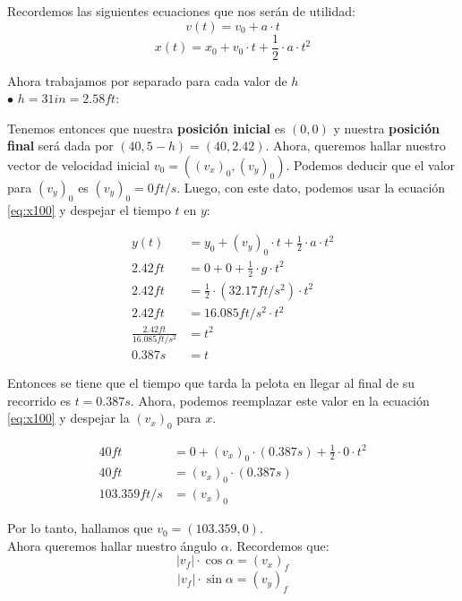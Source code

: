 \documentclass[11pt]{article}
\begin{document}
Recordemos las siguientes ecuaciones que nos serán de utilidad:
\begin{equation}
  \label{eq:v100}
  v(t) = v_0 + a \cdot t
\end{equation}
\begin{equation}
  \label{eq:x100}
  x(t) = x_0 + v_0 \cdot t + \frac{1}{2} \cdot a \cdot t^2 
\end{equation}

Ahora trabajamos por separado para cada valor de $h$ \\
 
$\bullet$ $h = 31in = 2.58ft$:

Tenemos entonces que nuestra \textbf{posición inicial} es $(0, 0)$ y nuestra
\textbf{posición final} será dada por $(40, 5 - h) = (40, 2.42)$. Ahora, 
queremos hallar nuestro vector de velocidad inicial $v_0 = ((v_x)_0, (v_y)_0)$.
Podemos deducir que el valor para $(v_y)_0$ es $ (v_y)_0 = 0 ft/s$.
Luego, con este dato, podemos usar la ecuación \ref{eq:x100} y despejar el tiempo $t$ en $y$:

\begin{align*}
  y(t) &= y_0 + (v_y)_0 \cdot t + \frac{1}{2} \cdot a \cdot t^2 \\
  2.42ft &= 0 + 0 + \frac{1}{2} \cdot g \cdot t^2 \\
  2.42ft &= \frac{1}{2} \cdot (32.17ft/s^2) \cdot t^2 \\
  2.42ft &= 16.085ft/s^2 \cdot t^2  \\
  \frac{2.42ft}{16.085ft/s^2} &= t^2 \\
  0.387s &= t
\end{align*}

Entonces se tiene que el tiempo que tarda la pelota en llegar al final de su
recorrido es $t = 0.387s$. Ahora, podemos reemplazar este valor en la ecuación \ref{eq:x100}
y despejar la $(v_x)_0$ para $x$.

\begin{align*}
  40ft &= 0 + (v_x)_0 \cdot (0.387s) + \frac{1}{2} \cdot 0 \cdot t^2 \\
  40ft &= (v_x)_0 \cdot (0.387s) \\
  103.359ft/s &= (v_x)_0
\end{align*}

Por lo tanto, hallamos que $v_0 = (103.359, 0)$. \\

Ahora queremos hallar nuestro ángulo $\alpha$. Recordemos que:
\begin{equation}
  \label{eq:modx100}
  \vert v_f \vert \cdot \cos \alpha = (v_x)_f
\end{equation}
\begin{equation}
  \label{eq:mody100}
  \vert v_f \vert \cdot \sin \alpha = (v_y)_f  
\end{equation}
\end{document}
